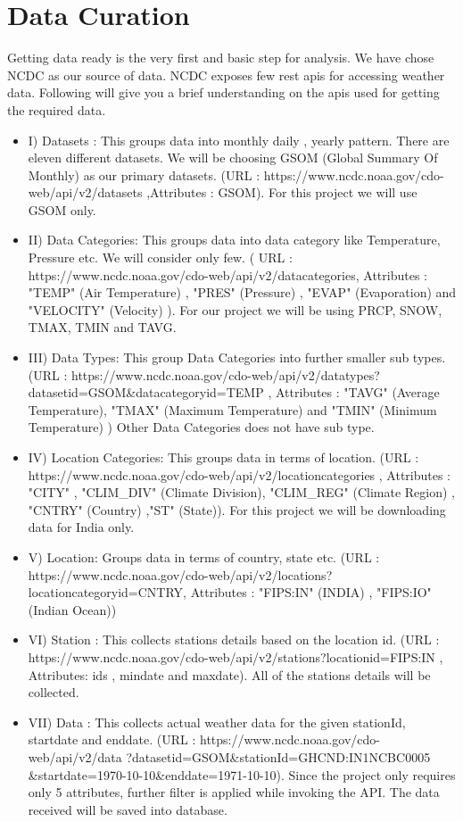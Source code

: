 \documentclass[9pt,twocolumn,twoside]{../../styles/osajnl}
\begin{document}
\section{Data Curation}
Getting data ready is the very first and basic step for analysis. We have chose NCDC as our source of data. NCDC exposes few rest apis for accessing weather data. Following will give you a brief understanding on the apis used for getting the required data.
\begin{itemize}
\item I) Datasets : This groups data into monthly daily , yearly pattern. There are eleven different datasets. We will be choosing GSOM (Global Summary Of Monthly) as our primary datasets. (URL : https://www.ncdc.noaa.gov/cdo-web/api/v2/datasets ,Attributes : GSOM). For this project we will use GSOM only.	
\item II) Data Categories: This groups data into data category like Temperature, Pressure etc. We will consider only few. ( URL : https://www.ncdc.noaa.gov/cdo-web/api/v2/datacategories, Attributes : "TEMP" (Air Temperature) , "PRES" (Pressure) , "EVAP" (Evaporation) and "VELOCITY" (Velocity) ). For our project we will be using PRCP, SNOW, TMAX, TMIN and TAVG.
\item III) Data Types: This group Data Categories into further smaller sub types. (URL : https://www.ncdc.noaa.gov/cdo-web/api/v2/datatypes?datasetid=GSOM\&datacategoryid=TEMP , Attributes : "TAVG" (Average Temperature), "TMAX" (Maximum Temperature) and "TMIN" (Minimum Temperature)    ) Other Data Categories does not have sub type.
\item IV) Location Categories: This groups data in terms of location. (URL : https://www.ncdc.noaa.gov/cdo-web/api/v2/locationcategories , Attributes : "CITY" , "CLIM\_DIV" (Climate Division), "CLIM\_REG" (Climate Region) , "CNTRY" (Country) ,"ST" (State)). For this project we will be downloading data for India only.
\item V)  Location: Groups data in terms of country, state etc. (URL : https://www.ncdc.noaa.gov/cdo-web/api/v2/locations?locationcategoryid=CNTRY, Attributes : "FIPS:IN" (INDIA) , "FIPS:IO" (Indian Ocean))	
\item VI) Station : This collects stations details based on the location id. (URL : https://www.ncdc.noaa.gov/cdo-web/api/v2/stations?locationid=FIPS:IN , Attributes: ids , mindate and maxdate). All of the stations details will be collected.	
\item VII) 	Data : This collects actual weather data for the given stationId,
 startdate and enddate. (URL : https://www.ncdc.noaa.gov/cdo-web/api/v2/data 
 ?datasetid=GSOM\&stationId=GHCND:IN1NCBC0005
 \&startdate=1970-10-10\&enddate=1971-10-10).
 Since the project only requires only 5 attributes, 
 further filter is applied while invoking the API. The data received will be saved into database. 
\end{itemize}
\end{document}
